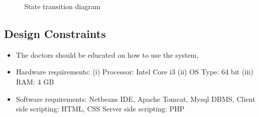 \documentclass[oneside,a4paper,12pt]{book}
\begin{document}
\begin{center}
	\begin{figure}[!htbp]
		\centering
	  \caption{State transition diagram}
	  \label{fig:state-dig}
	\end{figure}
\end{center} 
 
 \subsection{Design Constraints}	
 \begin{itemize}
 \item The doctors should be educated on how to use the system,
\item Hardware requirements:
(i) Processor: Intel Core i3
(ii) OS Type: 64 bit
(iii) RAM: 4 GB
\item Software requirements:
 Netbeans IDE, Apache Tomcat, Mysql DBMS, Client side scripting: HTML, CSS
Server side scripting: PHP
 \end{itemize}
\end{document}
